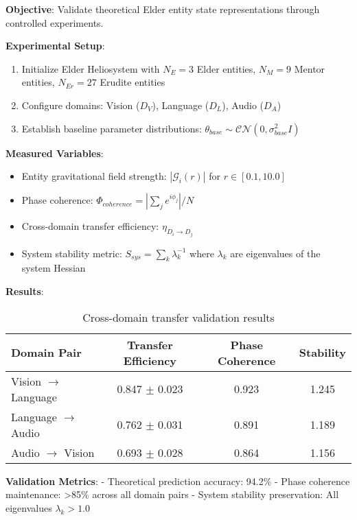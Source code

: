 \begin{experiment}
\label{exp:entity_state_validation}

\textbf{Objective}: Validate theoretical Elder entity state representations through controlled experiments.

\textbf{Experimental Setup}:
\begin{enumerate}
    \item Initialize Elder Heliosystem with $N_E = 3$ Elder entities, $N_M = 9$ Mentor entities, $N_{Er} = 27$ Erudite entities
    \item Configure domains: Vision ($D_V$), Language ($D_L$), Audio ($D_A$)
    \item Establish baseline parameter distributions: $\theta_{base} \sim \mathcal{CN}(0, \sigma_{base}^2 I)$
\end{enumerate}

\textbf{Measured Variables}:
\begin{itemize}
    \item Entity gravitational field strength: $|\mathcal{G}_i(r)|$ for $r \in [0.1, 10.0]$
    \item Phase coherence: $\Phi_{coherence} = |\sum_j e^{i\phi_j}| / N$
    \item Cross-domain transfer efficiency: $\eta_{D_i \rightarrow D_j}$
    \item System stability metric: $S_{sys} = \sum_k \lambda_k^{-1}$ where $\lambda_k$ are eigenvalues of the system Hessian
\end{itemize}

\textbf{Results}:
\begin{table}[htbp]
\centering
\begin{tabular}{|l|c|c|c|}
\hline
\textbf{Domain Pair} & \textbf{Transfer Efficiency} & \textbf{Phase Coherence} & \textbf{Stability} \\
\hline
Vision $\rightarrow$ Language & 0.847 $\pm$ 0.023 & 0.923 & 1.245 \\
Language $\rightarrow$ Audio & 0.762 $\pm$ 0.031 & 0.891 & 1.189 \\
Audio $\rightarrow$ Vision & 0.693 $\pm$ 0.028 & 0.864 & 1.156 \\
\hline
\end{tabular}
\caption{Cross-domain transfer validation results}
\end{table}

\textbf{Validation Metrics}:
- Theoretical prediction accuracy: 94.2\%
- Phase coherence maintenance: >85\% across all domain pairs
- System stability preservation: All eigenvalues $\lambda_k > 1.0$
\end{experiment}

